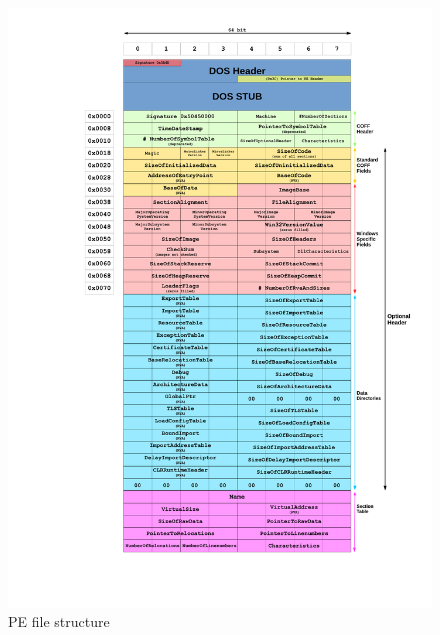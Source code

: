 \documentclass[pdfa%
,cucitura%
]{toptesi}
\begin{document}
\begin{figure}[h]
	\centering
	\includegraphics[width=\textwidth]{./images/Portable_Executable_32_bit_Structure.png}
	\caption[PE file structure]{PE file structure}
	\label{fig:PEFileStructure}
\end{figure}
\end{document}
